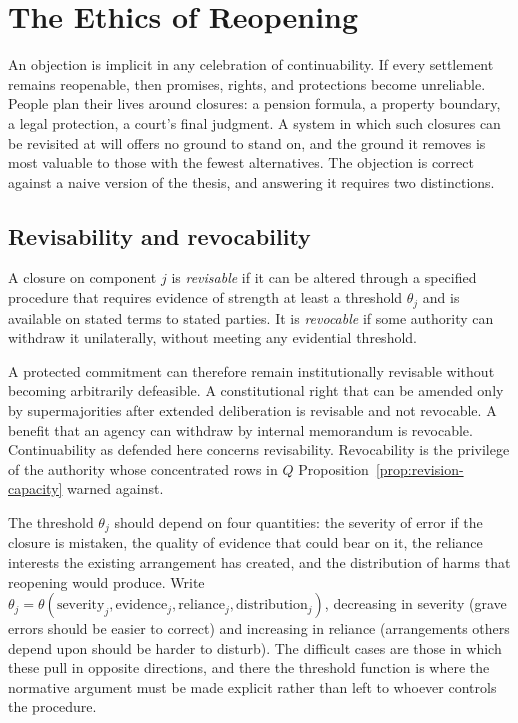 \section{The Ethics of Reopening}\label{sec:reopening}

An objection is implicit in any celebration of continuability. If every settlement remains reopenable, then promises, rights, and protections become unreliable. People plan their lives around closures: a pension formula, a property boundary, a legal protection, a court's final judgment. A system in which such closures can be revisited at will offers no ground to stand on, and the ground it removes is most valuable to those with the fewest alternatives. The objection is correct against a naive version of the thesis, and answering it requires two distinctions.

\subsection{Revisability and revocability}

\begin{definition}
A closure on component $j$ is \emph{revisable} if it can be altered through a specified procedure that requires evidence of strength at least a threshold $\theta_j$ and is available on stated terms to stated parties. It is \emph{revocable} if some authority can withdraw it unilaterally, without meeting any evidential threshold.
\end{definition}

A protected commitment can therefore remain institutionally revisable without becoming arbitrarily defeasible. A constitutional right that can be amended only by supermajorities after extended deliberation is revisable and not revocable. A benefit that an agency can withdraw by internal memorandum is revocable. Continuability as defended here concerns revisability. Revocability is the privilege of the authority whose concentrated rows in $Q$ Proposition~\ref{prop:revision-capacity} warned against.

The threshold $\theta_j$ should depend on four quantities: the severity of error if the closure is mistaken, the quality of evidence that could bear on it, the reliance interests the existing arrangement has created, and the distribution of harms that reopening would produce. Write $\theta_j=\theta(\text{severity}_j,\text{evidence}_j,\text{reliance}_j,\text{distribution}_j)$, decreasing in severity (grave errors should be easier to correct) and increasing in reliance (arrangements others depend upon should be harder to disturb). The difficult cases are those in which these pull in opposite directions, and there the threshold function is where the normative argument must be made explicit rather than left to whoever controls the procedure.

